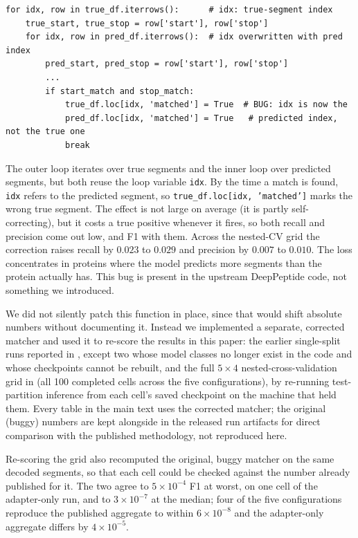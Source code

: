 \documentclass{article}
\begin{document}
\begin{lstlisting}
for idx, row in true_df.iterrows():      # idx: true-segment index
    true_start, true_stop = row['start'], row['stop']
    for idx, row in pred_df.iterrows():  # idx overwritten with pred index
        pred_start, pred_stop = row['start'], row['stop']
        ...
        if start_match and stop_match:
            true_df.loc[idx, 'matched'] = True  # BUG: idx is now the
            pred_df.loc[idx, 'matched'] = True   # predicted index, not the true one
            break
\end{lstlisting}

The outer loop iterates over true segments and the inner loop over predicted segments, but both reuse the loop variable \texttt{idx}. By the time a match is found, \texttt{idx} refers to the predicted segment, so \texttt{true\_df.loc[idx, 'matched']} marks the wrong true segment. The effect is not large on average (it is partly self-correcting), but it costs a true positive whenever it fires, so both recall and precision come out low, and F1 with them. Across the nested-CV grid the correction raises recall by $0.023$ to $0.029$ and precision by $0.007$ to $0.010$. The loss concentrates in proteins where the model predicts more segments than the protein actually has. This bug is present in the upstream DeepPeptide code, not something we introduced.

We did not silently patch this function in place, since that would shift absolute numbers without documenting it. Instead we implemented a separate, corrected matcher and used it to re-score the results in this paper: the earlier single-split runs reported in , except two whose model classes no longer exist in the code and whose checkpoints cannot be rebuilt, and the full $5\times4$ nested-cross-validation grid in  (all 100 completed cells across the five configurations), by re-running test-partition inference from each cell's saved checkpoint on the machine that held them. Every table in the main text uses the corrected matcher; the original (buggy) numbers are kept alongside in the released run artifacts for direct comparison with the published methodology, not reproduced here.

Re-scoring the grid also recomputed the original, buggy matcher on the same decoded segments, so that each cell could be checked against the number already published for it. The two agree to $5\times10^{-4}$ F1 at worst, on one cell of the adapter-only run, and to $3\times10^{-7}$ at the median; four of the five configurations reproduce the published aggregate to within $6\times10^{-8}$ and the adapter-only aggregate differs by $4\times10^{-5}$.
\end{document}
